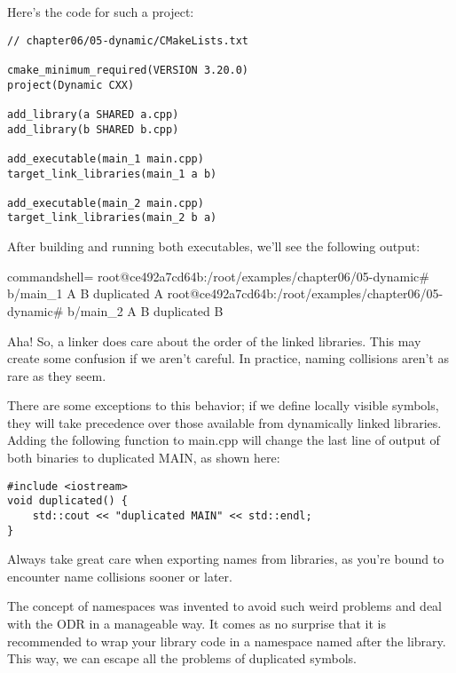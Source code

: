 Here's the code for such a project:

\begin{lstlisting}[style=styleCMake]
// chapter06/05-dynamic/CMakeLists.txt
	
cmake_minimum_required(VERSION 3.20.0)
project(Dynamic CXX)

add_library(a SHARED a.cpp)
add_library(b SHARED b.cpp)

add_executable(main_1 main.cpp)
target_link_libraries(main_1 a b)

add_executable(main_2 main.cpp)
target_link_libraries(main_2 b a)
\end{lstlisting}

After building and running both executables, we'll see the following output:

\begin{tcblisting}{commandshell={}}
root@ce492a7cd64b:/root/examples/chapter06/05-dynamic# b/main_1
A B
duplicated A
root@ce492a7cd64b:/root/examples/chapter06/05-dynamic# b/main_2
A
B
duplicated B
\end{tcblisting}

Aha! So, a linker does care about the order of the linked libraries. This may create some confusion if we aren't careful. In practice, naming collisions aren't as rare as they seem.

There are some exceptions to this behavior; if we define locally visible symbols, they will take precedence over those available from dynamically linked libraries. Adding the following function to main.cpp will change the last line of output of both binaries to duplicated MAIN, as shown here:

\begin{lstlisting}[style=styleCXX]
#include <iostream>
void duplicated() {
	std::cout << "duplicated MAIN" << std::endl;
}
\end{lstlisting}

Always take great care when exporting names from libraries, as you're bound to encounter name collisions sooner or later.


The concept of namespaces was invented to avoid such weird problems and deal with the ODR in a manageable way. It comes as no surprise that it is recommended to wrap your library code in a namespace named after the library. This way, we can escape all the problems of duplicated symbols.

